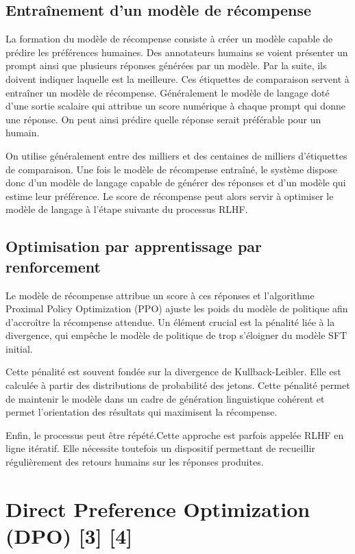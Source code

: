 \documentclass[12pt,a4paper]{report}
\begin{document}
\section{Entraînement d'un modèle de récompense}

La formation du modèle de récompense consiste à créer un modèle capable de prédire les préférences 
humaines. Des annotateurs humains se voient présenter un prompt ainsi que plusieurs réponses générées 
par un modèle. Par la suite, ils doivent indiquer laquelle est la meilleure. Ces étiquettes de 
comparaison servent à entraîner un modèle de récompense. Généralement le modèle de langage doté d'une 
sortie scalaire qui attribue un score numérique à chaque prompt qui donne une réponse. On peut ainsi 
prédire quelle réponse serait préférable pour un humain.

On utilise généralement entre des milliers et des centaines de milliers d'étiquettes de comparaison. 
Une fois le modèle de récompense entraîné, le système dispose donc d'un modèle de langage capable de 
générer des réponses et d'un modèle qui estime leur préférence. Le score de récompense peut alors 
servir à optimiser le modèle de langage à l'étape suivante du processus RLHF.


\section{Optimisation par apprentissage par renforcement}

Le modèle de récompense attribue un score à ces réponses et l'algorithme Proximal Policy Optimization (PPO) 
ajuste les poids du modèle de politique afin d'accroître la récompense attendue. Un élément crucial 
est la pénalité liée à la divergence, qui empêche le modèle de politique de trop s'éloigner 
du modèle SFT initial. 

Cette pénalité est souvent fondée sur la divergence de Kullback-Leibler. Elle est calculée à partir 
des distributions de probabilité des jetons. Cette pénalité permet de maintenir le modèle dans un 
cadre de génération linguistique cohérent et permet l'orientation des résultats qui maximisent la 
récompense.

Enfin, le processus peut être répété.Cette approche est parfois appelée RLHF en ligne itératif. 
Elle nécessite toutefois un dispositif permettant de recueillir régulièrement des retours humains 
sur les réponses produites.


\chapter{Direct Preference Optimization (DPO) [3] [4]}
\end{document}

